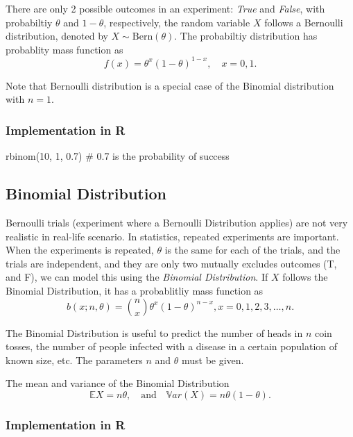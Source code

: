 \documentclass[
  letterpaper,
  DIV=11,
  numbers=noendperiod]{scrreprt}
\newenvironment{Shaded}{\begin{snugshade}}{\end{snugshade}}
\newcommand{\CommentTok}[1]{\textcolor[rgb]{0.37,0.37,0.37}{#1}}
\newcommand{\DecValTok}[1]{\textcolor[rgb]{0.68,0.00,0.00}{#1}}
\newcommand{\FloatTok}[1]{\textcolor[rgb]{0.68,0.00,0.00}{#1}}
\newcommand{\FunctionTok}[1]{\textcolor[rgb]{0.28,0.35,0.67}{#1}}
\newcommand{\NormalTok}[1]{\textcolor[rgb]{0.00,0.23,0.31}{#1}}
\begin{document}
There are only 2 possible outcomes in an experiment: \emph{True} and
\emph{False}, with probabiltiy \(\theta\) and \(1-\theta\),
respectively, the random variable \(X\) follows a Bernoulli
distribution, denoted by \(X\sim \text{Bern}(\theta)\). The probabiltiy
distribution has probablity mass function as
\[f(x) = \theta^x (1-\theta)^{1-x},\quad x=0,1.\]

Note that Bernoulli distribution is a special case of the Binomial
distribution with \(n=1\).

\subsubsection{Implementation in R}\label{implementation-in-r-1}

\begin{Shaded}
\begin{Highlighting}[]
\FunctionTok{rbinom}\NormalTok{(}\DecValTok{10}\NormalTok{, }\DecValTok{1}\NormalTok{, }\FloatTok{0.7}\NormalTok{) }\CommentTok{\# 0.7 is the probability of success}
\end{Highlighting}
\end{Shaded}

\subsection{Binomial Distribution}\label{binomial-distribution}

Bernoulli trials (experiment where a Bernoulli Distribution applies) are
not very realistic in real-life scenario. In statistics, repeated
experiments are important. When the experiments is repeated, \(\theta\)
is the same for each of the trials, and the trials are independent, and
they are only two mutually excludes outcomes (T, and F), we can model
this using the \emph{Binomial Distribution}. If \(X\) follows the
Binomial Distribution, it has a probablitliy mass function as
\[b(x ; n, \theta)=\binom{n}{x} \theta^x(1-\theta)^{n-x}, x=0,1,2,3, \ldots, n.\]

The Binomial Distribution is useful to predict the number of heads in
\(n\) coin tosses, the number of people infected with a disease in a
certain population of known size, etc. The parameters \(n\) and
\(\theta\) must be given.

The mean and variance of the Binomial Distribution \[
\mathbb{E}X = n\theta,\quad \text{and}\quad \mathbb{V}ar(X) = n\theta(1-\theta).\]

\subsubsection{Implementation in R}\label{implementation-in-r-2}
\end{document}
